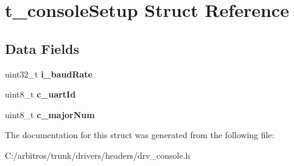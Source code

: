 \hypertarget{structt__console_setup}{\section{t\-\_\-console\-Setup Struct Reference}
\label{structt__console_setup}
}
\subsection*{Data Fields}
\begin{DoxyCompactItemize}
\item 
\hypertarget{structt__console_setup_ac316d01a82a05edc681fdfe0bac24060}{uint32\-\_\-t {\bfseries i\-\_\-baud\-Rate}}\label{structt__console_setup_ac316d01a82a05edc681fdfe0bac24060}

\item 
\hypertarget{structt__console_setup_a40f57779b05162e1cea2635c18c6dad9}{uint8\-\_\-t {\bfseries c\-\_\-uart\-Id}}\label{structt__console_setup_a40f57779b05162e1cea2635c18c6dad9}

\item 
\hypertarget{structt__console_setup_afba9106eb2fa769623759a1b529f884e}{uint8\-\_\-t {\bfseries c\-\_\-major\-Num}}\label{structt__console_setup_afba9106eb2fa769623759a1b529f884e}

\end{DoxyCompactItemize}


The documentation for this struct was generated from the following file\-:\begin{DoxyCompactItemize}
\item 
C\-:/arbitros/trunk/drivers/headers/drv\-\_\-console.\-h\end{DoxyCompactItemize}
